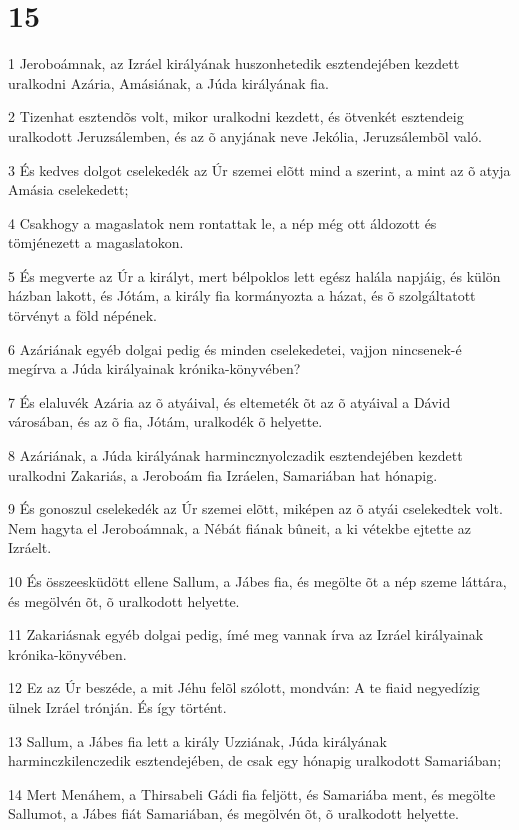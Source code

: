 \chapter{15}

\par 1 Jeroboámnak, az Izráel királyának huszonhetedik esztendejében kezdett uralkodni Azária, Amásiának, a Júda királyának fia.
\par 2 Tizenhat esztendõs volt, mikor uralkodni kezdett, és ötvenkét esztendeig uralkodott Jeruzsálemben, és az õ anyjának neve Jekólia, Jeruzsálembõl való.
\par 3 És kedves dolgot cselekedék az Úr szemei elõtt mind a szerint, a mint az õ atyja Amásia cselekedett;
\par 4 Csakhogy a magaslatok nem rontattak le, a nép még ott áldozott és tömjénezett a magaslatokon.
\par 5 És megverte az Úr a királyt, mert bélpoklos lett egész halála napjáig, és külön házban lakott, és Jótám, a király fia kormányozta a házat, és õ szolgáltatott törvényt a föld népének.
\par 6 Azáriának egyéb dolgai pedig és minden cselekedetei, vajjon nincsenek-é megírva a Júda királyainak krónika-könyvében?
\par 7 És elaluvék Azária az õ atyáival, és eltemeték õt az õ atyáival a Dávid városában, és az õ fia,  Jótám, uralkodék õ helyette.
\par 8 Azáriának, a Júda királyának harmincznyolczadik esztendejében kezdett uralkodni Zakariás, a Jeroboám fia Izráelen, Samariában hat hónapig.
\par 9 És gonoszul cselekedék az Úr szemei elõtt, miképen az õ atyái cselekedtek volt. Nem hagyta el Jeroboámnak, a Nébát fiának bûneit, a ki vétekbe ejtette az Izráelt.
\par 10 És összeesküdött ellene Sallum, a Jábes fia, és megölte õt a nép szeme láttára, és megölvén õt, õ uralkodott helyette.
\par 11 Zakariásnak egyéb dolgai pedig, ímé meg vannak írva az Izráel királyainak krónika-könyvében.
\par 12 Ez az Úr beszéde, a mit Jéhu felõl szólott, mondván: A te fiaid negyedízig ülnek Izráel trónján. És így történt.
\par 13 Sallum, a Jábes fia lett a király Uzziának, Júda királyának harminczkilenczedik esztendejében, de csak egy hónapig uralkodott Samariában;
\par 14 Mert Menáhem, a Thirsabeli Gádi fia feljött, és Samariába ment, és megölte Sallumot, a Jábes fiát Samariában, és megölvén õt, õ uralkodott helyette.
